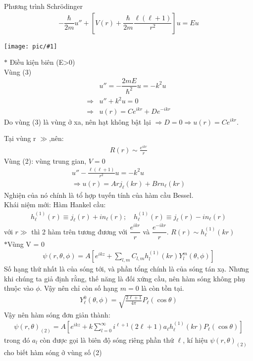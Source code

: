 \documentclass{report}
\newcommand{\image}[1]{
	\begin{center}
		\texttt{[image: pic/\#1]}
	\end{center}
}
\renewcommand{\l}{\ell}
\begin{document}
Phương trình Schr\"{o}dinger
\begin{align*}
	-\dfrac{\hbar}{2m}u'' + \left[V({r})+ \dfrac{\hbar}{2m}\dfrac{\l(\l+1)}{r^2}\right]u = Eu
\end{align*}
\image{zone.png}
$\ast$ Điều kiện biên (E>0)\\
Vùng (3)
\begin{align*}
	            & u'' = -\dfrac{2mE}{\hbar^2}u = -k^2u \\
	\Rightarrow & u'' + k^2u =0                        \\
	\Rightarrow & u({r})=Ce^{i{kr}} +De^{-i{kr}}
\end{align*}
Do vùng (3) là vùng ở xa, nên hạt không bật lại $\Rightarrow D = 0 \Rightarrow u({r})=Ce^{i{kr}}$.

Tại vùng r $\gg$,nên:
\begin{align*}
	R(r) \sim \frac{e^{i{kr}}}{{r}}
\end{align*}
Vùng (2): vùng trung gian, $V=0$
\begin{align*}
	u'' - \frac{\l(\l+1)}{r^2}u = -k^2u \\
	\Rightarrow u(r) = Arj_{\l}(kr)+  Brn_{\l}(kr)
\end{align*}
Nghiện của nó chính là tổ hợp tuyến tính của hàm cầu Bessel.\\
Khái niệm mới: Hàm Hankel cầu:
\begin{align}
	h_{\l}^{(1)}(r) \equiv j_{\l}(r) + in_{\l}(r); \quad h_{\l}^{(1)}(r) \equiv j_{\l}(r) - in_{\l}(r)
\end{align}\label{eq1.3}
với $r \gg$ thì 2 hàm trên tương đương với $\dfrac{e^{i{kr}}}{r}$ và $\dfrac{e^{-i{kr}}}{r}$. $R(r)\sim h_{\l}^{(1)}(kr)$\\
$\ast$Vùng V = 0
\begin{align*}
	\psi(r,\theta,\phi) = A \left[e^{i{kz}} + \sum_{l,m}C_{l,m} h_l^{(1)}(kr) Y_l^m(\theta,\phi)  \right]
\end{align*}
Số hạng thứ nhất là của sóng tới, và phần tổng chính là của sóng tán xạ. Nhưng khi chúng ta giả định rằng, thế năng là đối xứng cầu, nên hàm sóng không phụ thuộc vào $\phi$. Vậy nên chỉ còn số hạng $m=0$ là còn tồn tại.
\begin{align*}
	Y_{\l}^0 (\theta,\phi) = \sqrt{\frac{2\l+1}{4\pi}}P_{\l}(\cos\theta)
\end{align*}
Vậy nên hàm sóng đơn giản thành:
\begin{align*}
	\psi(r,\theta)_{(2)} = A \left[e^{i{kz}} + k\sum_{l=0}^{\infty}i^{\l+1}(2\l+1)a_{\l} h_{\l}^{(1)}(kr) P_{\l}(\cos\theta)\right]
\end{align*}
trong đó $a_l$ còn được gọi là biên độ sóng riêng phần thứ $\l$, kí hiệu $\psi(r,\theta)_{(2)}$ cho biết hàm sóng ở vùng số (2)
\end{document}
